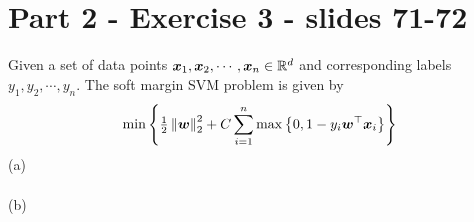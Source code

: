 \section{Part 2 - Exercise 3 - slides 71-72}
%
Given a set of data points $\boldsymbol x_1, \boldsymbol x_2,\cdots,\boldsymbol x_n \in \mathbb{R}^d$ and 
corresponding labels $y_1,y_2,\cdots,y_n$. The soft margin SVM problem is given 
by 
\begin{equation*}
    \min \left\{{\textstyle\frac{1}{2}}\left\lVert\boldsymbol w\right\rVert_{2}^2+C \sum_{i=1}^{n} \max 
    \left\{0,1-y_i \boldsymbol w^\top \boldsymbol x_i\right\}\right\}
\end{equation*}
%
\indent (a) \\
%
\\
\indent (b) \\



